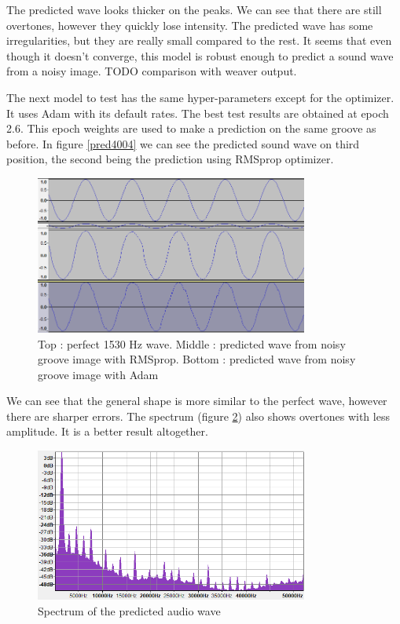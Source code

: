 \documentclass[12pt, twoside]{article}
\begin{document}
The predicted wave looks thicker on the peaks. We can see that there are still overtones, however they quickly lose intensity. The predicted wave has some irregularities, but they are really small compared to the rest. It seems that even though it doesn't converge, this model is robust enough to predict a sound wave from a noisy image. TODO comparison with weaver output.

The next model to test has the same hyper-parameters except for the optimizer. It uses Adam with its default rates. The best test results are obtained at epoch 2.6. This epoch weights are used to make a prediction on the same groove as before. In figure \ref{pred4004} we can see the predicted sound wave on third position, the second being the prediction using RMSprop optimizer.
\begin{figure}
	\centering
	\includegraphics[width=0.8\textwidth]{../images/pred4004.png}
	\caption{Top : perfect 1530 Hz wave. Middle :  predicted wave from noisy groove image with RMSprop. Bottom : predicted wave from noisy groove image with Adam}
	\label{predm4004}
\end{figure}
We can see that the general shape is more similar to the perfect wave, however there are sharper errors. The spectrum (figure \ref{spectrum4004}) also shows overtones with less amplitude. It is a better result altogether.
\begin{figure}
	\centering
	\includegraphics[width=0.8\textwidth]{../images/spectrum_m4004.png}
	\caption{Spectrum of the predicted audio wave}
	\label{spectrum4004}
\end{figure}
\end{document}
